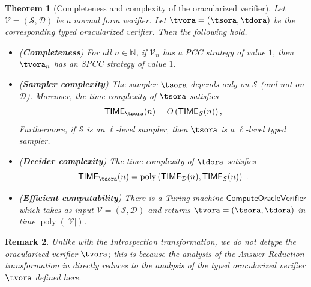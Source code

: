 \documentclass[11pt]{article}
\newtheorem{theorem}{Theorem}[section]
\newtheorem{remark}[theorem]{Remark}
\theoremstyle{definition}
\newcommand{\N}{\ensuremath{\mathbb{N}}}
\DeclareMathOperator{\poly}{poly}
\newcommand{\abs}[1]{\left\vert {#1} \right\vert}
\newcommand{\sampler}{\mathcal{S}}
\newcommand{\decider}{\mathcal{D}}
\newcommand{\verifier}{\mathcal{V}}
\newcommand{\TIME}{\mathsf{TIME}}
\newcommand{\tmstyle}[1]{\ensuremath{\mathsf{#1}}}
\newcommand{\ComputeOracleVerifier}{\tmstyle{ComputeOracleVerifier}}
\begin{document}
\begin{theorem}[Completeness and complexity of the oracularized verifier]
  \label{thm:oracle-completeness}
  Let $\verifier = (\sampler, \decider)$ be a normal form verifier.
  Let $\tvora = (\tsora,\tdora)$ be the corresponding
  typed oracularized verifier.
  Then the following hold.
  \begin{itemize}
  \item (\textbf{Completeness}) For all $n \in \N$, if $\verifier_n$ has a PCC
    strategy of value $1$, then $\tvora_n$ has an
    SPCC strategy of value $1$.
  
  \item (\textbf{Sampler complexity}) The sampler $\tsora$ depends only
    on $\sampler$ (and not on $\decider$).
    Moreover, the time complexity of $\tsora$ satisfies
    \begin{equation*}
      \TIME_{\tsora}(n) = O \left (\TIME_{\sampler}(n)
      \right),
    \end{equation*}
    Furthermore, if $\sampler$ is an $\ell$-level sampler, then
    $\tsora$ is a $\ell$-level typed sampler.

  \item (\textbf{Decider complexity}) The time complexity of $\tdora$
    satisfies
    \begin{equation*}
      \TIME_{\tdora}(n) = \poly \left (\TIME_{\decider}(n),
        \TIME_\sampler(n) \right)\;.
    \end{equation*}

	\item (\textbf{Efficient computability}) There is a Turing machine
    $\ComputeOracleVerifier$ which takes as input $\verifier =
    (\sampler,\decider)$ and returns $\tvora = ( \tsora,
    \tdora)$ in time $\poly(\abs{\verifier})$.
  \end{itemize}
\end{theorem}


\begin{remark}
Unlike with the Introspection transformation, we do not detype the oracularized verifier $\tvora$; this is because the analysis of the Answer Reduction transformation in  \emph{directly} reduces to the analysis of the typed oracularized verifier $\tvora$ defined here.
\end{remark}
\end{document}
